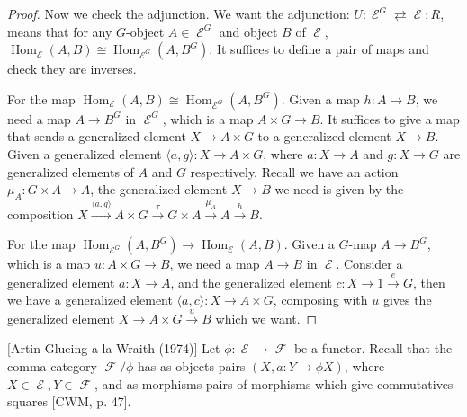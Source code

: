 \documentclass[a4paper]{article}
\DeclareMathOperator{\Hom}{\text {Hom}}
\DeclareMathOperator{\E}{\mathcal E}
\DeclareMathOperator{\F}{\mathcal F}
\begin{document}
\begin{proof}
    Now we check the adjunction. We want the adjunction:
    $U:\E^G\rightleftarrows \E: R$, means that for any $G$-object $A\in \E^G$ and object $B$ of $\E$, $\Hom_{\E}(A,B)\cong \Hom_{\E^G}(A,B^G)$. It suffices to define a pair of maps and check they are inverses.

    For the map $\Hom_{\E}(A,B)\cong \Hom_{\E^G}(A,B^G)$. Given a map $h:A\to B$, we need a map $A\to B^G$ in $\E^G$, which is a map $A\times G\to B$. It suffices to give a map that sends a generalized element $X\to A\times G$ to a generalized element $X\to B$. Given a generalized element $\langle a,g\rangle:X\to A\times G$, where $a:X\to A$ and $g:X\to G$ are generalized elements of $A$ and $G$ respectively. Recall we have an action $\mu_A:G\times A\to A$, the generalized element $X\to B$ we need is given by the composition $X\overset{\langle a,g\rangle}\to A\times G\overset{\tau}\to G\times A\overset{\mu_A}\to A\overset{h}\to B$.  
    
    For the map $\Hom_{\E^G}(A,B^G)\to \Hom_{\E}(A,B)$. Given a $G$-map $A\to B^G$, which is a map $u:A\times G\to B$, we need a map $A\to B$ in $\E$. Consider a generalized element $a:X\to A$, and the generalized element $c:X\to 1\overset{e}\to G$, then we have a generalized element $\langle a,c\rangle :X\to A\times G$, composing with $u$ gives the generalized element $X\to A\times G\overset{u}\to B$ which we want. 
    

    
    
    
\end{proof}

\begin{question}
    $[$Artin Glueing a la Wraith (1974)$]$ Let $\phi:\E\to \F$ be a functor. Recall that the comma category $\F/\phi$ has as objects pairs $(X,a:Y\to \phi X)$, where $X\in \E,Y\in \F$, and as morphisms pairs of morphisms which give commutatives squares [CWM, p. 47].
\end{question}
\end{document}
